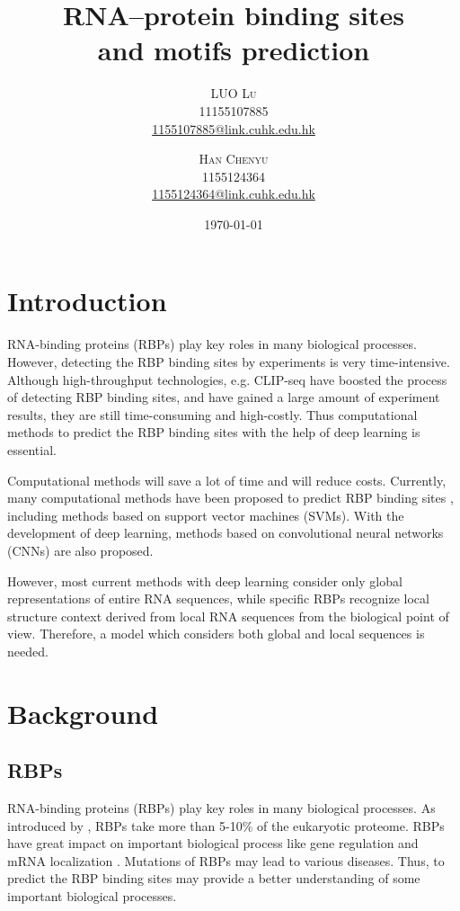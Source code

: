 \documentclass[twoside,twocolumn]{article}
\title{RNA–protein binding sites \\ and motifs prediction} %
\author{%
\textsc{LUO Lu} \\[1ex] %
\normalsize 11155107885 \\ %
\normalsize \href{mailto:1155107885@link.cuhk.edu.hk}{1155107885@link.cuhk.edu.hk}
\and
\textsc{Han Chenyu}\\[1ex] %
\normalsize 1155124364 \\ %
\normalsize \href{mailto:1155124364@link.cuhk.edu.hk}{1155124364@link.cuhk.edu.hk} %
}
\date{\today} %
\begin{document}
\maketitle


\section{Introduction}

\lettrine[nindent=0em,lines=3]{R} NA-binding proteins (RBPs) play key roles in 
many biological processes. However, detecting the RBP binding sites by 
experiments is very time-intensive. 
Although high-throughput technologies, e.g. CLIP-seq \cite{ref5} have
boosted the process of detecting RBP binding sites, and have gained a large amount
of experiment results, they are still time-consuming and high-costly.
Thus computational 
methods to predict the RBP binding sites with the help of deep learning is 
essential. 

Computational methods will save a lot of time and will reduce costs. 
Currently, many computational methods have been proposed to predict RBP binding
sites \cite{ref6}, including methods based on support vector machines
(SVMs). With the development of deep learning, methods based on convolutional
neural networks (CNNs) are also proposed.

However, most current methods with deep learning consider only global 
representations of entire RNA sequences, while specific RBPs recognize 
local structure context derived from local RNA sequences from the biological 
point of view. Therefore, a model which considers both global and local 
sequences is needed.


\section{Background}
    \subsection{RBPs}
    RNA-binding proteins (RBPs) play key roles in 
    many biological processes. As introduced by \cite{ref7}, RBPs 
    take more than 5-10\% of the eukaryotic proteome. RBPs have great impact 
    on important biological process like gene regulation \cite{ref8} and mRNA 
    localization \cite{ref9}. Mutations of RBPs 
    may lead to various diseases. Thus, to predict the RBP binding sites may
    provide a better understanding of some important biological processes.
\end{document}
